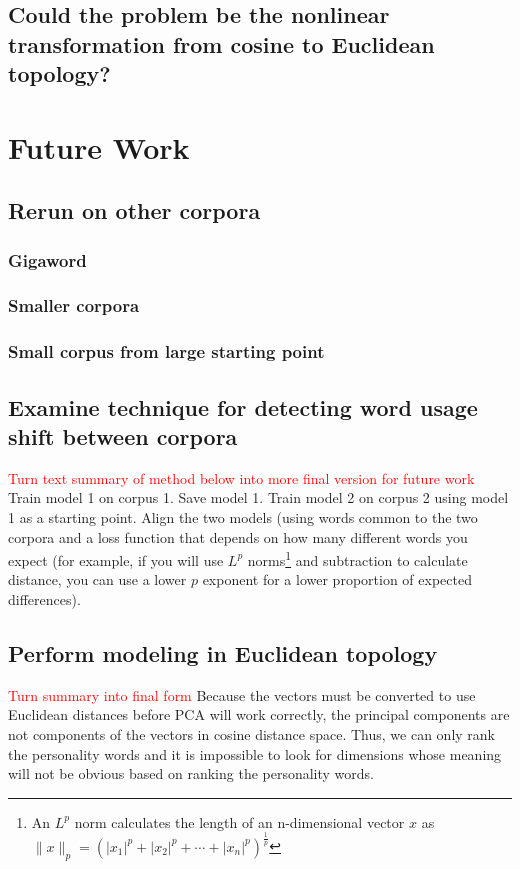 \documentclass[10pt,letterpaper]{book}
\newcommand{\todo}[1]{\textcolor{red}{#1}}
\begin{document}
\section{Could the problem be the nonlinear transformation from cosine to Euclidean topology?}

\chapter{Future Work}

\section{Rerun on other corpora}

\subsection{Gigaword}
\subsection{Smaller corpora}
\subsection{Small corpus from large starting point}

\section{Examine technique for detecting word usage shift between corpora}

\todo{Turn text summary of method below into more final version for future work}
Train model 1 on corpus 1. Save model 1. Train model 2 on corpus 2 using model 1 as a starting point. Align the two models (using words common to the two corpora and a loss function that depends on how many different words you expect (for example, if you will use $L^p$ norms\footnote{An $L^p$ norm calculates the length of an n-dimensional vector $x$ as $\|x\|_p=\left(|x_1|^p+|x_2|^p+\dotsb+|x_n|^p\right)^{\frac{1}{p}}$} and subtraction to calculate distance, you can use a lower $p$ exponent for a lower proportion of expected differences).

\section{Perform modeling in Euclidean topology}

\todo{Turn summary into final form}
Because the vectors must be converted to use Euclidean distances before PCA will work correctly, the principal components are not components of the vectors in cosine distance space. Thus, we can only rank the personality words and it is impossible to look for dimensions whose meaning will not be obvious based on ranking the personality words.
\end{document}
